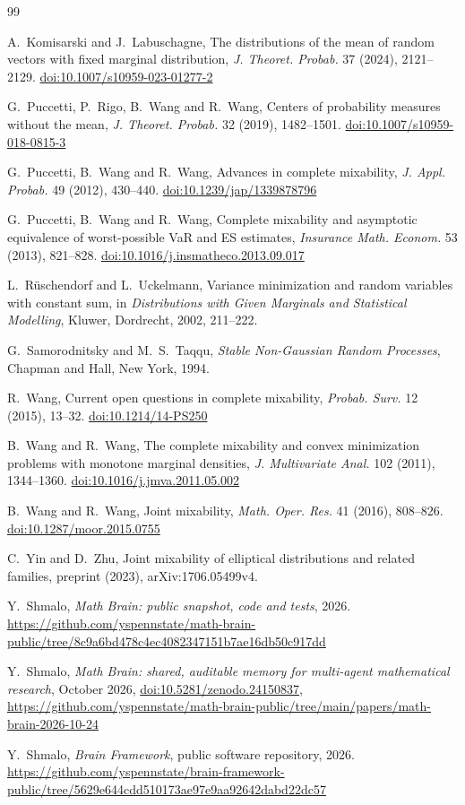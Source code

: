 \documentclass[11pt]{article}
\theoremstyle{definition}
\theoremstyle{remark}
\providecommand{\doi}[1]{\href{https://doi.org/#1}{doi:#1}}
\begin{document}
\begin{thebibliography}{99}

A.~Komisarski and J.~Labuschagne, The distributions of the mean of random vectors with fixed marginal
distribution, \emph{J. Theoret. Probab.} 37 (2024), 2121--2129. \doi{10.1007/s10959-023-01277-2}

G.~Puccetti, P.~Rigo, B.~Wang and R.~Wang, Centers of probability measures without the mean, \emph{J. Theoret.
Probab.} 32 (2019), 1482--1501. \doi{10.1007/s10959-018-0815-3}

G.~Puccetti, B.~Wang and R.~Wang, Advances in complete mixability, \emph{J. Appl. Probab.} 49 (2012), 430--440. \doi{10.1239/jap/1339878796}

G.~Puccetti, B.~Wang and R.~Wang, Complete mixability and asymptotic equivalence of worst-possible VaR and ES
estimates, \emph{Insurance Math. Econom.} 53 (2013), 821--828. \doi{10.1016/j.insmatheco.2013.09.017}

L.~R\"uschendorf and L.~Uckelmann, Variance minimization and random variables with constant sum, in
\emph{Distributions with Given Marginals and Statistical Modelling}, Kluwer, Dordrecht, 2002, 211--222.

G.~Samorodnitsky and M.~S.~Taqqu, \emph{Stable Non-Gaussian Random Processes}, Chapman and Hall, New York, 1994.

R.~Wang, Current open questions in complete mixability, \emph{Probab. Surv.} 12 (2015), 13--32.
\doi{10.1214/14-PS250}

B.~Wang and R.~Wang, The complete mixability and convex minimization problems with monotone marginal densities,
\emph{J. Multivariate Anal.} 102 (2011), 1344--1360. \doi{10.1016/j.jmva.2011.05.002}

B.~Wang and R.~Wang, Joint mixability, \emph{Math. Oper. Res.} 41 (2016), 808--826. \doi{10.1287/moor.2015.0755}

C.~Yin and D.~Zhu, Joint mixability of elliptical distributions and related families, preprint (2023),
arXiv:1706.05499v4.

Y.~Shmalo, \emph{Math Brain: public snapshot, code and tests}, 2026.
\url{https://github.com/yspennstate/math-brain-public/tree/8c9a6bd478c4ec4082347151b7ae16db50c917dd}

Y.~Shmalo, \emph{Math Brain: shared, auditable memory for multi-agent mathematical research}, October 2026, \doi{10.5281/zenodo.24150837},
\url{https://github.com/yspennstate/math-brain-public/tree/main/papers/math-brain-2026-10-24}

Y.~Shmalo, \emph{Brain Framework}, public software repository, 2026.
\url{https://github.com/yspennstate/brain-framework-public/tree/5629e644cdd510173ae97e9aa92642dabd22dc57}

\end{thebibliography}
\end{document}
